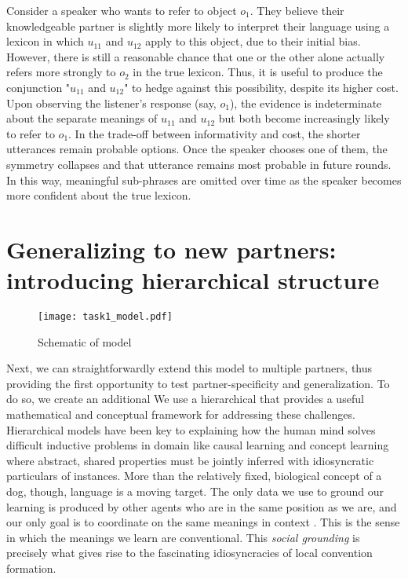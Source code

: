Consider a speaker who wants to refer to object $o_1$. 
They believe their knowledgeable partner is slightly more likely to interpret their language using a lexicon in which $u_{11}$ and $u_{12}$ apply to this object, due to their initial bias. 
However, there is still a reasonable chance that one or the other alone actually refers more strongly to $o_2$ in the true lexicon. 
Thus, it is useful to produce the conjunction "$u_{11}$ and $u_{12}$" to hedge against this possibility, despite its higher cost. 
Upon observing the listener's response (say, $o_1$), the evidence is indeterminate about the separate meanings of $u_{11}$ and $u_{12}$ but both become increasingly likely to refer to $o_1$. 
In the trade-off between informativity and cost, the shorter utterances remain probable options. 
Once the speaker chooses one of them, the symmetry collapses and that utterance remains most probable in future rounds. 
In this way, meaningful sub-phrases are omitted over time as the speaker becomes more confident about the true lexicon. 

\section{Generalizing to new partners: introducing hierarchical structure}

\begin{figure}
\centering
    \texttt{[image: task1\_model.pdf]}
  \caption{Schematic of model}
  \label{fig:task1model}
\end{figure}

Next, we can straightforwardly extend this model to multiple partners, thus providing the first opportunity to test partner-specificity and generalization.
To do so, we create an additional We use a hierarchical  \cite{GelmanEtAl14_BDA,TenenbaumKempGriffithsGoodman11_Grow_a_Mind_Science,KleinschmidtJaeger15_RobustSpeechPerception} that provides a useful mathematical and conceptual framework for addressing these challenges. Hierarchical models have been key to explaining how the human mind solves difficult inductive problems in domain like causal learning \cite{KempGoodmanTenenbaum10_LearningToLearn,GoodmanUllmanTenenbaum11_TheoryOfCausality} and concept learning \cite{KempPerforsTenenbaum07_HBM} where abstract, shared properties must be jointly inferred with idiosyncratic particulars of instances. More than the relatively fixed, biological concept of a dog, though, language is a moving target. The only data we use to ground our learning is produced by other agents who are in the same position as we are, and our only goal is to coordinate on the same meanings in context \cite{HassonGhazanfar___Keysers12BrainToBrain}. This is the sense in which the meanings we learn are conventional. This \emph{social grounding} is precisely what gives rise to the fascinating idiosyncracies of local convention formation.

